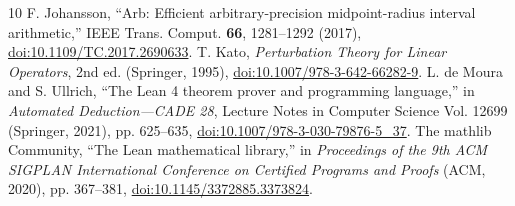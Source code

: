\documentclass[aps,pre,reprint,groupedaddress,nofootinbib,showkeys,floatfix]{revtex4-2}
\begin{document}
\begin{thebibliography}{10}
 F. Johansson, ``Arb: Efficient arbitrary-precision midpoint-radius interval arithmetic,'' IEEE Trans. Comput. \textbf{66}, 1281--1292 (2017), \href{https://doi.org/10.1109/TC.2017.2690633}{doi:10.1109/TC.2017.2690633}.
 T. Kato, \textit{Perturbation Theory for Linear Operators}, 2nd ed. (Springer, 1995), \href{https://doi.org/10.1007/978-3-642-66282-9}{doi:10.1007/978-3-642-66282-9}.
 L. de Moura and S. Ullrich, ``The Lean 4 theorem prover and programming language,'' in \textit{Automated Deduction---CADE 28}, Lecture Notes in Computer Science Vol. 12699 (Springer, 2021), pp. 625--635, \href{https://doi.org/10.1007/978-3-030-79876-5_37}{doi:10.1007/978-3-030-79876-5\_37}.
 The mathlib Community, ``The Lean mathematical library,'' in \textit{Proceedings of the 9th ACM SIGPLAN International Conference on Certified Programs and Proofs} (ACM, 2020), pp. 367--381, \href{https://doi.org/10.1145/3372885.3373824}{doi:10.1145/3372885.3373824}.
\end{thebibliography}
\end{document}
